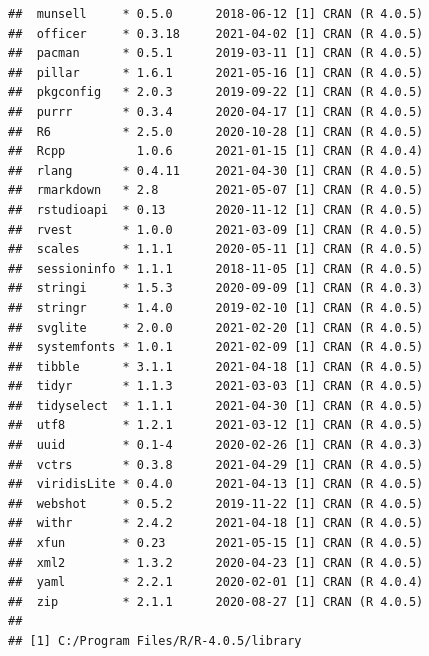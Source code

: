 \documentclass[
  11pt,
]{article}
\begin{document}
\begin{verbatim}
##  munsell     * 0.5.0      2018-06-12 [1] CRAN (R 4.0.5)                   
##  officer     * 0.3.18     2021-04-02 [1] CRAN (R 4.0.5)                   
##  pacman      * 0.5.1      2019-03-11 [1] CRAN (R 4.0.5)                   
##  pillar      * 1.6.1      2021-05-16 [1] CRAN (R 4.0.5)                   
##  pkgconfig   * 2.0.3      2019-09-22 [1] CRAN (R 4.0.5)                   
##  purrr       * 0.3.4      2020-04-17 [1] CRAN (R 4.0.5)                   
##  R6          * 2.5.0      2020-10-28 [1] CRAN (R 4.0.5)                   
##  Rcpp          1.0.6      2021-01-15 [1] CRAN (R 4.0.4)                   
##  rlang       * 0.4.11     2021-04-30 [1] CRAN (R 4.0.5)                   
##  rmarkdown   * 2.8        2021-05-07 [1] CRAN (R 4.0.5)                   
##  rstudioapi  * 0.13       2020-11-12 [1] CRAN (R 4.0.5)                   
##  rvest       * 1.0.0      2021-03-09 [1] CRAN (R 4.0.5)                   
##  scales      * 1.1.1      2020-05-11 [1] CRAN (R 4.0.5)                   
##  sessioninfo * 1.1.1      2018-11-05 [1] CRAN (R 4.0.5)                   
##  stringi     * 1.5.3      2020-09-09 [1] CRAN (R 4.0.3)                   
##  stringr     * 1.4.0      2019-02-10 [1] CRAN (R 4.0.5)                   
##  svglite     * 2.0.0      2021-02-20 [1] CRAN (R 4.0.5)                   
##  systemfonts * 1.0.1      2021-02-09 [1] CRAN (R 4.0.5)                   
##  tibble      * 3.1.1      2021-04-18 [1] CRAN (R 4.0.5)                   
##  tidyr       * 1.1.3      2021-03-03 [1] CRAN (R 4.0.5)                   
##  tidyselect  * 1.1.1      2021-04-30 [1] CRAN (R 4.0.5)                   
##  utf8        * 1.2.1      2021-03-12 [1] CRAN (R 4.0.5)                   
##  uuid        * 0.1-4      2020-02-26 [1] CRAN (R 4.0.3)                   
##  vctrs       * 0.3.8      2021-04-29 [1] CRAN (R 4.0.5)                   
##  viridisLite * 0.4.0      2021-04-13 [1] CRAN (R 4.0.5)                   
##  webshot     * 0.5.2      2019-11-22 [1] CRAN (R 4.0.5)                   
##  withr       * 2.4.2      2021-04-18 [1] CRAN (R 4.0.5)                   
##  xfun        * 0.23       2021-05-15 [1] CRAN (R 4.0.5)                   
##  xml2        * 1.3.2      2020-04-23 [1] CRAN (R 4.0.5)                   
##  yaml        * 2.2.1      2020-02-01 [1] CRAN (R 4.0.4)                   
##  zip         * 2.1.1      2020-08-27 [1] CRAN (R 4.0.5)                   
## 
## [1] C:/Program Files/R/R-4.0.5/library
\end{verbatim}
\end{document}
